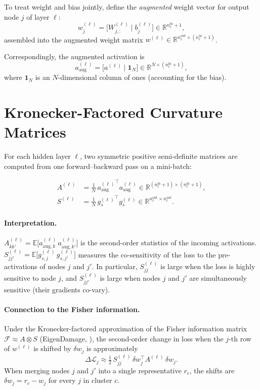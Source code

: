 \documentclass[11pt]{article}
\begin{document}
To treat weight and bias jointly, define the \emph{augmented} weight vector for
output node $j$ of layer $\ell$:
\[
  w_j^{(\ell)} = \bigl[W^{(\ell)}_{j,:} \;\big|\; b^{(\ell)}_j\bigr]
  \in \mathbb{R}^{n_\ell^{\mathrm{in}} + 1},
\]
assembled into the augmented weight matrix
$w^{(\ell)} \in \mathbb{R}^{n_\ell^{\mathrm{out}} \times (n_\ell^{\mathrm{in}}+1)}$.

Correspondingly, the augmented activation is
\[
  a_{\mathrm{aug}}^{(\ell)} = \bigl[a^{(\ell)} \;\big|\; \mathbf{1}_N\bigr]
  \in \mathbb{R}^{N \times (n_\ell^{\mathrm{in}}+1)},
\]
where $\mathbf{1}_N$ is an $N$-dimensional column of ones (accounting for the bias).

\section{Kronecker-Factored Curvature Matrices}

For each hidden layer $\ell$, two symmetric positive semi-definite matrices are
computed from one forward--backward pass on a mini-batch:

\begin{align}
  A^{(\ell)} &= \frac{1}{N}\,{a_{\mathrm{aug}}^{(\ell)}}^{\!\top} a_{\mathrm{aug}}^{(\ell)}
               \in \mathbb{R}^{(n_\ell^{\mathrm{in}}+1)\times(n_\ell^{\mathrm{in}}+1)}, \label{eq:A}\\[4pt]
  S^{(\ell)} &= \frac{1}{N}\,{g_s^{(\ell)}}^{\!\top} g_s^{(\ell)}
               \in \mathbb{R}^{n_\ell^{\mathrm{out}}\times n_\ell^{\mathrm{out}}}. \label{eq:S}
\end{align}

\paragraph{Interpretation.}
$A^{(\ell)}_{kk'} = \mathbb{E}\bigl[a_{\mathrm{aug},k}^{(\ell)}\,a_{\mathrm{aug},k'}^{(\ell)}\bigr]$
is the second-order statistics of the incoming activations.
$S^{(\ell)}_{jj'} = \mathbb{E}\bigl[g_{s,j}^{(\ell)}\,g_{s,j'}^{(\ell)}\bigr]$
measures the co-sensitivity of the loss to the pre-activations of nodes $j$
and $j'$. In particular, $S_{jj}^{(\ell)}$ is large when the loss is highly
sensitive to node $j$, and $S_{jj'}^{(\ell)}$ is large when nodes $j$ and
$j'$ are simultaneously sensitive (their gradients co-vary).

\paragraph{Connection to the Fisher information.}
Under the Kronecker-factored approximation of the Fisher information
matrix $\mathcal{F} \approx A \otimes S$ (EigenDamage, \cite{george2018eigendamage}),
the second-order change in loss when the $j$-th row of $w^{(\ell)}$ is shifted
by $\delta w_j$ is approximately
\[
  \Delta\mathcal{L}_j \approx \tfrac{1}{2}\,S_{jj}^{(\ell)}\,\delta w_j^{\top} A^{(\ell)}\,\delta w_j.
\]
When merging nodes $j$ and $j'$ into a single representative $r_c$, the
shifts are $\delta w_j = r_c - w_j$ for every $j$ in cluster $c$.
\end{document}
